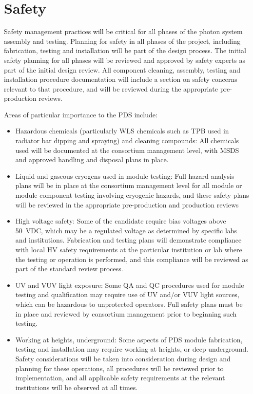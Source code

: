 \section{Safety}
\label{sec:fdsp-pd-safety}

Safety management practices will be critical for all phases of the photon system assembly and testing.  Planning for safety in all phases of the project, including fabrication, testing and installation will be part of the design process.  The initial safety planning for all phases will be reviewed and approved by safety experts as part of the initial design review.  All component cleaning, assembly, testing  and installation procedure documentation will include a section on safety concerns relevant to that procedure, and will be reviewed during the appropriate pre-production reviews.

Areas of particular importance to the PDS include:
\begin{itemize}
\item Hazardous chemicals (particularly WLS chemicals such as TPB used in radiator bar dipping and spraying) and cleaning compounds:  All chemicals used will be documented at the consortium management level, with MSDS and approved handling and disposal plans in place.

\item Liquid and gaseous cryogens used in module testing:  Full hazard analysis plans will be in place at the consortium management level for all module or module component testing involving cryogenic hazards, and these safety plans will be reviewed in the appropriate pre-production and production reviews

\item High voltage safety:  Some of the candidate  require bias voltages above \SI{50}{VDC}, which may be a regulated voltage as determined by specific labs and institutions.  Fabrication and testing plans will demonstrate compliance with local HV safety requirements at the particular institution or lab where the testing or operation is performed, and this compliance will be reviewed as part of the standard review process.

\item UV and VUV light exposure:  Some QA and QC procedures used for module testing and qualification may require use of UV and/or VUV light sources, which can be hazardous  to unprotected operators.  Full safety plans must be in place and reviewed by consortium management prior to beginning such testing.

\item Working at heights, underground:  Some aspects of PDS module fabrication, testing and installation may require working at heights, or deep underground.  Safety considerations will be taken into consideration during design and planning for these operations, all procedures will be reviewed prior to implementation, and all applicable safety requirements at the relevant institutions will be observed at all times.

\end{itemize}
